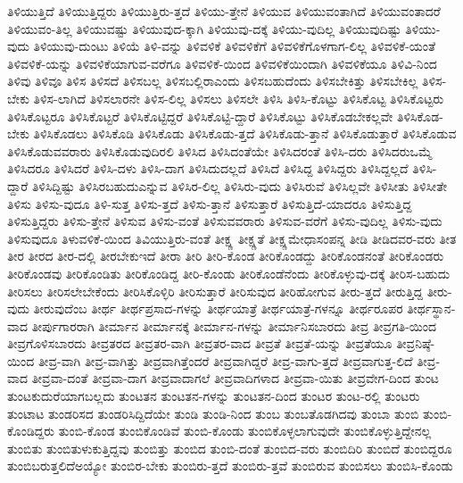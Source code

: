 {ತಿಳಿಯುತ್ತಿದೆ
ತಿಳಿಯುತ್ತಿದ್ದರು
ತಿಳಿಯುತ್ತಿರು-ತ್ತದೆ
ತಿಳಿಯು-ತ್ತೇನೆ
ತಿಳಿಯುವ
ತಿಳಿಯುವಂತಾಗಿದೆ
ತಿಳಿಯುವಂತಾದರೆ
ತಿಳಿಯುವಂ-ತಿಲ್ಲ
ತಿಳಿಯುವಷ್ಟು
ತಿಳಿಯುವುದ-ಕ್ಕಾಗಿ
ತಿಳಿಯುವು-ದಕ್ಕೆ
ತಿಳಿಯು-ವುದಿಲ್ಲ
ತಿಳಿಯುವುದಿಷ್ಟು
ತಿಳಿಯು-ವುದು
ತಿಳಿಯುವು-ದುಂಟು
ತಿಳಿಯೆ
ತಿಳಿ-ವನ್ನು
ತಿಳಿವಳಿಕೆ
ತಿಳಿವಳಿಕೆಗೆ
ತಿಳಿವಳಿಕೆಗೊಳಗಾಗ-ಲಿಲ್ಲ
ತಿಳಿವಳಿಕೆ-ಯಂತೆ
ತಿಳಿವಳಿಕೆ-ಯನ್ನು
ತಿಳಿವಳಿಕೆಯಾಗುವ-ವರೆಗೂ
ತಿಳಿವಳಿಕೆ-ಯಿಂದ
ತಿಳಿವಳಿಕೆಯಿಂದಾಗಿ
ತಿಳಿವಳಿಕೆಯೂ
ತಿಳಿವಿ-ನಿಂದ
ತಿಳಿವು
ತಿಳಿವೂ
ತಿಳಿಸ
ತಿಳಿಸದೆ
ತಿಳಿಸಬಲ್ಲ
ತಿಳಿಸಬಲ್ಲಿರಾಎಂದು
ತಿಳಿಸಬಹುದೆಂದು
ತಿಳಿಸಬೇಕಿತ್ತು
ತಿಳಿಸಬೇಕಿಲ್ಲ
ತಿಳಿಸ-ಬೇಕು
ತಿಳಿಸ-ಲಾಗಿದೆ
ತಿಳಿಸಲಾರನೇ
ತಿಳಿಸ-ಲಿಲ್ಲ
ತಿಳಿಸಲು
ತಿಳಿಸಲೇ
ತಿಳಿಸಿ
ತಿಳಿಸಿ-ಕೊಟ್ಟು
ತಿಳಿಸಿಕೊಟ್ಟ
ತಿಳಿಸಿಕೊಟ್ಟರು
ತಿಳಿಸಿಕೊಟ್ಟರೂ
ತಿಳಿಸಿಕೊಟ್ಟರೆ
ತಿಳಿಸಿಕೊಟ್ಟಿದ್ದರೆ
ತಿಳಿಸಿಕೊಟ್ಟಿ-ದ್ದಾರೆ
ತಿಳಿಸಿಕೊಟ್ಟು
ತಿಳಿಸಿಕೊಡಬೇಕಲ್ಲವೇ
ತಿಳಿಸಿಕೊಡ-ಬೇಕು
ತಿಳಿಸಿಕೊಡಲು
ತಿಳಿಸಿಕೊಡಿ
ತಿಳಿಸಿಕೊಡು
ತಿಳಿಸಿಕೊಡು-ತ್ತದೆ
ತಿಳಿಸಿಕೊಡು-ತ್ತಾನೆ
ತಿಳಿಸಿಕೊಡುತ್ತಾರೆ
ತಿಳಿಸಿಕೊಡುವ
ತಿಳಿಸಿಕೊಡುವವರಾರು
ತಿಳಿಸಿಕೊಡುವುದಿರಲಿ
ತಿಳಿಸಿದ
ತಿಳಿಸಿದಂತೆಯೇ
ತಿಳಿಸಿದರಂತೆ
ತಿಳಿಸಿ-ದರು
ತಿಳಿಸಿದರುಒಮ್ಮೆ
ತಿಳಿಸಿದರೂ
ತಿಳಿಸಿದರೆ
ತಿಳಿಸಿ-ದಳು
ತಿಳಿಸಿ-ದಾಗ
ತಿಳಿಸಿದುದಲ್ಲದೆ
ತಿಳಿಸಿದೆ
ತಿಳಿಸಿದ್ದ
ತಿಳಿಸಿದ್ದರು
ತಿಳಿಸಿದ್ದಲ್ಲದೆ
ತಿಳಿಸಿ-ದ್ದಾರೆ
ತಿಳಿಸಿದ್ದಿಷ್ಟು
ತಿಳಿಸಿರಬಹುದುಎನ್ನುವ
ತಿಳಿಸಿರ-ಲಿಲ್ಲ
ತಿಳಿಸಿರು-ವುದು
ತಿಳಿಸಿರುವೆ
ತಿಳಿಸಿಲ್ಲವೇ
ತಿಳಿಸೀತು
ತಿಳಿಸೀತೇ
ತಿಳಿಸು
ತಿಳಿಸು-ವುದೂ
ತಿಳಿ-ಸುತ್ತ
ತಿಳಿಸು-ತ್ತದೆ
ತಿಳಿಸು-ತ್ತಾನೆ
ತಿಳಿಸುತ್ತಾರೆ
ತಿಳಿಸುತ್ತಿದೆ-ಯಾದರೂ
ತಿಳಿಸುತ್ತಿದ್ದ
ತಿಳಿಸುತ್ತಿದ್ದರು
ತಿಳಿಸು-ತ್ತೇನೆ
ತಿಳಿಸುವ
ತಿಳಿಸು-ವಂತೆ
ತಿಳಿಸುವವರಾರು
ತಿಳಿಸುವ-ವರೆಗೆ
ತಿಳಿಸು-ವುದಿಲ್ಲ
ತಿಳಿಸು-ವುದು
ತಿಳಿಸುವುದೂ
ತಿಳುವಳಿಕೆ-ಯಿಂದ
ತಿವಿಯುತ್ತಿರು-ವಂತೆ
ತೀಕ್ಷ್ಣ
ತೀಕ್ಷ್ಣತೆ
ತೀಕ್ಷ್ಣಮೇಧಾಸಂಪನ್ನ
ತೀಡಿ
ತೀಡಿದವರ-ವರು
ತೀತ
ತೀರ
ತೀರದ
ತೀರ-ದಲ್ಲಿ
ತೀರಬೇಕುಇದೆ
ತೀರಾ
ತೀರಿ
ತೀರಿ-ಕೊಂಡ
ತೀರಿಕೊಂಡದ್ದು
ತೀರಿಕೊಂಡನಂತೆ
ತೀರಿಕೊಂಡರು
ತೀರಿಕೊಂಡವು
ತೀರಿಕೊಂಡಿತು
ತೀರಿಕೊಂಡಿದ್ದ
ತೀರಿ-ಕೊಂಡು
ತೀರಿಕೊಂಡೆನೆಂದು
ತೀರಿಕೊಳ್ಳುವು-ದಕ್ಕೆ
ತೀರಿಸ-ಬಹುದು
ತೀರಿಸಲು
ತೀರಿಸಲೇಬೇಕೆಂದು
ತೀರಿಸಿಕೊಳ್ಳಿರಿ
ತೀರಿಸುತ್ತಾರೆ
ತೀರಿಸುವುದ
ತೀರಿಹೋಗುವ
ತೀರು-ತ್ತದೆ
ತೀರುತ್ತಿದ್ದ
ತೀರು-ವುದು
ತೀರುವುದೆಂಬ
ತೀರ್ಥ
ತೀರ್ಥಪ್ರಸಾದ-ಗಳನ್ನು
ತೀರ್ಥಯಾತ್ರೆ
ತೀರ್ಥಯಾತ್ರೆ-ಗಳನ್ನೂ
ತೀರ್ಥರೂಪರ
ತೀರ್ಥಸ್ಥಾನ-ವಾದ
ತೀರ್ಪುಗಾರರಾಗಿ
ತೀರ್ಮಾನ
ತೀರ್ಮಾನಕ್ಕೆ
ತೀರ್ಮಾನ-ಗಳನ್ನು
ತೀರ್ಮಾನಿಸಬಾರದು
ತೀವ್ರ
ತೀವ್ರಗತಿ-ಯಿಂದ
ತೀವ್ರಗೊಳಿಸಬಾರದು
ತೀವ್ರತರದ
ತೀವ್ರತರ-ವಾಗಿ
ತೀವ್ರತರ-ವಾದ
ತೀವ್ರತೆ
ತೀವ್ರತೆ-ಯನ್ನು
ತೀವ್ರತೆಯೂ
ತೀವ್ರನಿಷ್ಠೆ-ಯಿಂದ
ತೀವ್ರ-ವಾಗಿ
ತೀವ್ರ-ವಾಗಿತ್ತು
ತೀವ್ರವಾಗಿತ್ತೆಂದರೆ
ತೀವ್ರವಾಗಿದ್ದರೆ
ತೀವ್ರ-ವಾಗು-ತ್ತದೆ
ತೀವ್ರವಾಗುತ್ತ-ಲಿದೆ
ತೀವ್ರ-ವಾದ
ತೀವ್ರವಾ-ದಂತೆ
ತೀವ್ರವಾ-ದಾಗ
ತೀವ್ರವಾದಾಗಲೆ
ತೀವ್ರವಾದಿಗಳಾದ
ತೀವ್ರವಾ-ಯಿತು
ತೀವ್ರವೇಗ-ದಿಂದ
ತುಂಟ
ತುಂಟಕುದುರೆಯಾಗಬಲ್ಲದು
ತುಂಟತನ
ತುಂಟತನ-ಗಳನ್ನು
ತುಂಟತನ-ದಿಂದ
ತುಂಟರ
ತುಂಟ-ರಲ್ಲಿ
ತುಂಟರು
ತುಂಟಾಟ
ತುಂಡರಿಸದ
ತುಂಡರಿಸಿದ್ದಿದೆಯೇ
ತುಂಡಿ
ತುಂಡಿ-ನಿಂದ
ತುಂಬ
ತುಂಬತೊಡಗಿದವು
ತುಂಬಾ
ತುಂಬಿ
ತುಂಬಿ-ಕೊಂಡಿದ್ದರು
ತುಂಬಿ-ಕೊಂಡ
ತುಂಬಿಕೊಂಡಿವೆ
ತುಂಬಿ-ಕೊಂಡು
ತುಂಬಿಕೊಳ್ಳಲಾಗುವುದೇ
ತುಂಬಿಕೊಳ್ಳುತ್ತಿದ್ದೇನಲ್ಲ
ತುಂಬಿತು
ತುಂಬಿತುಳುಕುತ್ತಿದ್ದವು
ತುಂಬಿತ್ತು
ತುಂಬಿದ
ತುಂಬಿ-ದಂತೆ
ತುಂಬಿದ-ವರು
ತುಂಬಿದಿರಿ
ತುಂಬಿದೆ
ತುಂಬಿದ್ದರೂ
ತುಂಬಿಬರುತ್ತಲಿದೆಅಯ್ಯೋ
ತುಂಬಿರ-ಬೇಕು
ತುಂಬಿರು-ತ್ತದೆ
ತುಂಬಿರು-ತ್ತವೆ
ತುಂಬಿರುವ
ತುಂಬಿಸಲು
ತುಂಬಿಸಿ-ಕೊಂಡು
}

